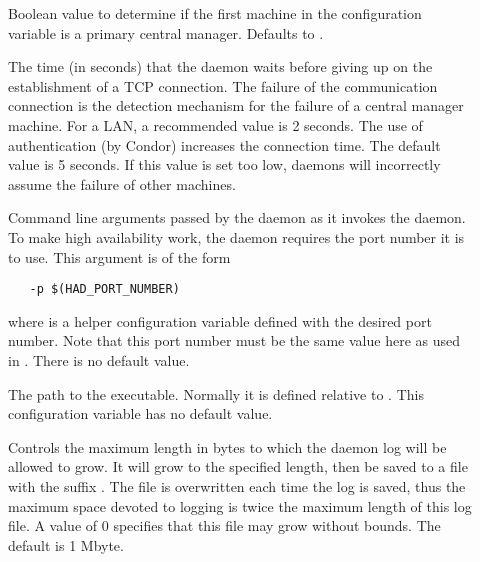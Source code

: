 \begin{description}
%
%
%
%

\item[]
  \label{param:HADUsePrimary}
  Boolean value to determine if the first machine in the 
   configuration variable is
  a primary central manager.
  Defaults to .


\item[]
  \label{param:HADConnectionTimeout}
  The time (in seconds) that the  daemon waits before giving
  up on the establishment of a TCP connection.
  The failure of the communication connection
  is the detection mechanism for the failure of a central
  manager machine.
  For a LAN, a recommended value is 2 seconds.
  The use of authentication (by Condor) increases the connection
  time.
  The default value is 5 seconds.
  If this value is set too low,
   daemons will incorrectly assume
  the failure of other machines.

\item[]
  \label{param:HADArgs}
  Command line arguments passed by the  daemon
  as it invokes the  daemon.
  To make high availability work, the  daemon
  requires the port number it is to use.
  This argument is of the form
  \begin{verbatim}
   -p $(HAD_PORT_NUMBER)
  \end{verbatim}
  where  is a helper configuration variable
  defined with the desired port number.
  Note that this port number must be the same value here as
  used in .
  There is no default value.


\item[]
  \label{param:HAD}
  The path to the  executable. Normally it is defined
  relative to .
  This configuration variable has no default value.

\item[]
  \label{param:MaxHADLog}
  Controls the maximum length in bytes to which the 
  daemon log will be allowed to grow. It will grow to the specified length,
  then be saved to a file with the suffix . 
  The   file is overwritten each time the log is saved,
  thus the maximum space devoted to logging is twice the maximum length
  of this log file.
  A value of 0 specifies that this file may grow without bounds.
  The default is 1 Mbyte.


\end{description}

